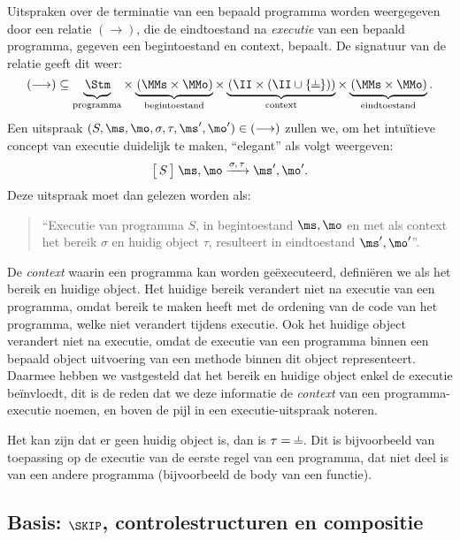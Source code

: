 Uitspraken over de terminatie van een bepaald programma worden weergegeven door een relatie $(\longrightarrow)$, die de eindtoestand na \emph{executie} van een bepaald programma, gegeven een begintoestand en context, bepaalt. De signatuur van de relatie geeft dit weer:
%
\begin{equation*}
  (\longrightarrow)
  \subseteq
  \underbrace{\phantom{|}\!\Stm}_\text{programma} \times
  \underbrace{\phantom{|}\!(\MMs \times \MMo)}_\text{begintoestand} \times
  \underbrace{\phantom{|}\!(\II \times (\II \cup \{\nil\}))}_\text{context} \times
  \underbrace{\phantom{|}\!(\MMs \times \MMo)}_\text{eindtoestand}
  .
\end{equation*}
%
Een uitspraak $(S,\ms,\mo,\sigma,\tau, \ms',\mo') \in (\longrightarrow)$ zullen we, om het intuïtieve concept van executie duidelijk te maken, ``elegant'' als volgt weergeven:
%
\begin{equation*}
  \Terminates{S}{\ms,\mo}{\sigma,\tau}{\ms',\mo'}.
\end{equation*}
%
Deze uitspraak moet dan gelezen worden als:

\begin{quote}
  ``Executie van programma $S$, in begintoestand $\ms, \mo$ en met als context het bereik $\sigma$ en huidig object $\tau$, resulteert in eindtoestand $\ms', \mo'$''.
\end{quote}

De \emph{context} waarin een programma kan worden geëxecuteerd, definiëren we als het bereik en huidige object. Het huidige bereik verandert niet na executie van een programma, omdat bereik te maken heeft met de ordening van de code van het programma, welke niet verandert tijdens executie. Ook het huidige object verandert niet na executie, omdat de executie van een programma binnen een bepaald object uitvoering van een methode binnen dit object representeert. Daarmee hebben we vastgesteld dat het bereik en huidige object enkel de executie beïnvloedt, dit is de reden dat we deze informatie de \emph{context} van een programma-executie noemen, en boven de pijl in een executie-uitspraak noteren.

Het kan zijn dat er geen huidig object is, dan is $\tau = \nil$. Dit is bijvoorbeeld van toepassing op de executie van de eerste regel van een programma, dat niet deel is van een andere programma (bijvoorbeeld de body van een functie).

\subsection{Basis: $\SKIP$, controlestructuren en compositie}

